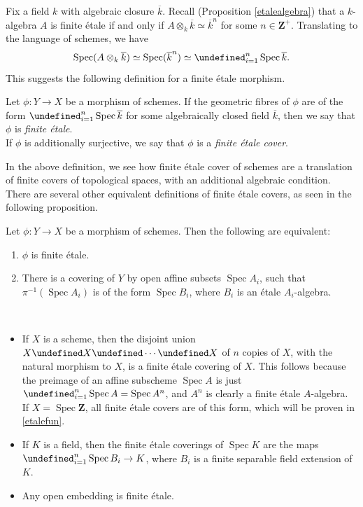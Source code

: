 \documentclass[11pt,openany]{book} %
\newcommand{\Z}{\mathbf{Z}}
\newcommand{\spc}{\operatorname{Spec}}
\let\coprod=\undefined
\begin{document}
Fix a field $k$ with algebraic closure $\overline{k}$. Recall (Proposition \ref{etalealgebra}) that a $k$-algebra $A$ is finite \'etale if and only if $A \otimes_{k} \overline{k} \simeq \overline{k}^n$ for some $n \in \Z^+$. Translating to the language of schemes, we have
\[
	\spc (A \otimes_k \overline{k}) \simeq \spc (\overline{k}^n) \simeq \coprod_{i=1}^{n} \spc \overline{k}.
\]
This suggests the following definition for a finite \'etale morphism.\\

\begin{definition}
Let $\phi : Y \to X$ be a morphism of schemes. If the geometric fibres of $\phi$ are of the form $\coprod_{i=1}^{n} \spc \overline{k}$ for some algebraically closed field $\overline{k}$, then we say that $\phi$ is \emph{finite \'etale}.\\

If $\phi$ is additionally surjective, we say that $\phi$ is a \emph{finite \'etale cover}.
\end{definition}

In the above definition, we see how finite \'etale cover of schemes are a translation of finite covers of topological spaces, with an additional algebraic condition. There are several other equivalent definitions of finite \'etale covers, as seen in the following proposition.\\

\begin{proposition}
Let $\phi : Y \to X$ be a morphism of schemes. Then the following are equivalent:
\begin{enumerate}
	\item $\phi$ is finite \'etale.
    \item There is a covering of $Y$ by open affine subsets $\spc A_i$, such that $\pi^{-1}(\spc A_i)$ is of the form $\spc B_i$, where $B_i$ is an \'etale $A_i$-algebra.
\end{enumerate}
\end{proposition}

\begin{example}\
\begin{itemize}
	\item If $X$ is a scheme, then the disjoint union $X \coprod X \coprod \cdots \coprod X$ of $n$ copies of $X$, with the natural morphism to $X$, is a finite \'etale covering of $X$. This follows because the preimage of an affine subscheme $\spc A$ is just $\coprod_{i=1}^{n} \spc A = \spc A^n$, and $A^n$ is clearly a finite \'etale $A$-algebra.\\

	If $X = \spc \Z$, all finite \'etale covers are of this form, which will be proven in \ref{etalefun}.

	\item If $K$ is a field, then the finite \'etale coverings of $\spc K$ are the maps $\coprod_{i=1}^{n} \spc B_i \to K$, where $B_i$ is a finite separable field extension of $K$.
    
    \item Any open embedding is finite \'etale.
\end{itemize}
\end{example}
\end{document}
